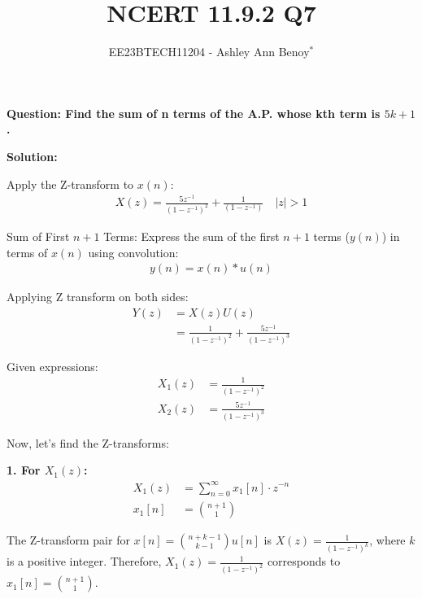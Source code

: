 \documentclass[journal,12pt,twocolumn]{IEEEtran}
\theoremstyle{remark}
\begin{document}

\vspace{3cm}

\title{NCERT 11.9.2  Q7}
\author{EE23BTECH11204 - Ashley Ann Benoy$^{*}$}%
\maketitle
\newpage
\bigskip

\renewcommand{\thefigure}{\theenumi}
\renewcommand{\thetable}{\theenumi}



\textbf{Question: Find the sum of n terms of the A.P. whose kth term is \(5k + 1\).}

\textbf{Solution:}


Apply the Z-transform to \( x(n) \):
\begin{align}
X(z) = \frac{5z^{-1}}{(1 - z^{-1})^2} + \frac{1}{(1 - z^{-1})}
\quad |z|>1
\end{align}

Sum of First \( n+1 \) Terms:
Express the sum of the first \( n+1 \) terms (\( y(n) \)) in terms of \( x(n) \) using convolution:
\begin{align}
y(n) = x(n) * u(n)
\end{align}

Applying Z transform on both sides:
\begin{align}
    Y(z) &= X(z)U(z)\\
    &=\frac{1}{(1-z^{-1})^2} + \frac{5z^{-1}}{(1-z^{-1})^3}
\end{align}

Given expressions:
\begin{align}
    X_1(z) &= \frac{1}{{(1 - z^{-1})^2}} \\
    X_2(z) &= \frac{5z^{-1}}{{(1 - z^{-1})^3}} \label{eq:x2z}
\end{align}

Now, let's find the Z-transforms:

\textbf{1. For \(X_1(z)\):}
\begin{align}
    X_1(z) &= \sum_{n=0}^{\infty} x_1[n] \cdot z^{-n} \\
    x_1[n] &= \binom{n+1}{1}
\end{align}

The Z-transform pair for \(x[n] = \binom{n+k-1}{k-1}u[n]\) is \(X(z) = \frac{1}{{(1 - z^{-1})^k}}\), where \(k\) is a positive integer. Therefore, \(X_1(z) = \frac{1}{{(1 - z^{-1})^2}}\) corresponds to \(x_1[n] = \binom{n+1}{1}\).
\end{document}
